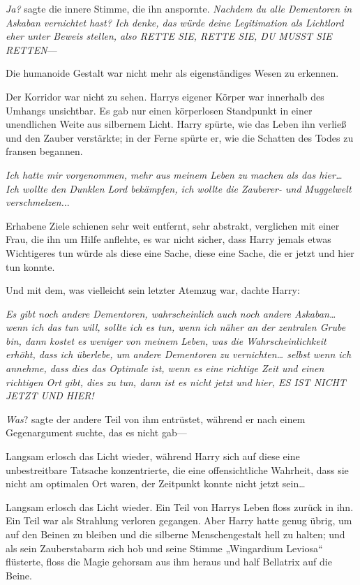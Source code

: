 {\emph{Ja?} sagte die innere Stimme, die ihn anspornte. \emph{Nachdem du alle Dementoren in Askaban vernichtet hast? Ich denke, das würde deine Legitimation als Lichtlord eher unter Beweis stellen, also RETTE SIE, RETTE SIE, DU MUSST SIE RETTEN}—

Die humanoide Gestalt war nicht mehr als eigenständiges Wesen zu erkennen.

Der Korridor war nicht zu sehen. Harrys eigener Körper war innerhalb des Umhangs unsichtbar. Es gab nur einen körperlosen Standpunkt in einer unendlichen Weite aus silbernem Licht. Harry spürte, wie das Leben ihn verließ und den Zauber verstärkte; in der Ferne spürte er, wie die Schatten des Todes zu fransen begannen.

\emph{Ich hatte mir vorgenommen, mehr aus meinem Leben zu machen als das hier… Ich wollte den Dunklen Lord bekämpfen, ich wollte die Zauberer- und Muggelwelt verschmelzen.}..

Erhabene Ziele schienen sehr weit entfernt, sehr abstrakt, verglichen mit einer Frau, die ihn um Hilfe anflehte, es war nicht sicher, dass Harry jemals etwas Wichtigeres tun würde als diese eine Sache, diese eine Sache, die er jetzt und hier tun konnte.

Und mit dem, was vielleicht sein letzter Atemzug war, dachte Harry:

\emph{Es gibt noch andere Dementoren, wahrscheinlich auch noch andere Askaban… wenn ich das tun will, sollte ich es tun, wenn ich näher an der zentralen Grube bin, dann kostet es weniger von meinem Leben, was die Wahrscheinlichkeit erhöht, dass ich überlebe, um andere Dementoren zu vernichten… selbst wenn ich annehme, dass dies das Optimale ist, wenn es eine richtige Zeit und einen richtigen Ort gibt, dies zu tun, dann ist es nicht jetzt und hier, ES IST NICHT JETZT UND HIER!}

\emph{Was}? sagte der andere Teil von ihm entrüstet, während er nach einem Gegenargument suchte, das es nicht gab—

Langsam erlosch das Licht wieder, während Harry sich auf diese eine unbestreitbare Tatsache konzentrierte, die eine offensichtliche Wahrheit, dass sie nicht am optimalen Ort waren, der Zeitpunkt konnte nicht jetzt sein…

Langsam erlosch das Licht wieder. Ein Teil von Harrys Leben floss zurück in ihn. Ein Teil war als Strahlung verloren gegangen. Aber Harry hatte genug übrig, um auf den Beinen zu bleiben und die silberne Menschengestalt hell zu halten; und als sein Zauberstabarm sich hob und seine Stimme „Wingardium Leviosa“ flüsterte, floss die Magie gehorsam aus ihm heraus und half Bellatrix auf die Beine.

}
